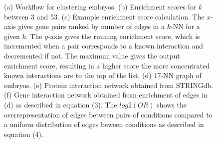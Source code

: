 \documentclass{article}
\begin{document}
\begin{figure}
\begin{subfigure}[b]{0.5\textwidth}
		\caption{}
		\label{}
	\end{subfigure}
	\caption{(a) Workflow for clustering embryos. 
	(b) Enrichment scores for $k$ between 3 and 53.
(c) Example enrichment score calculation. The $x$-axis gives gene pairs ranked by number of edges in a $k$-NN for a given $k$. The $y$-axis gives the running enrichment score, which is incremented when a pair corresponds to a known interaction and decremented if not. The maximum value gives the output enrichment score, resulting in a higher score the more concentrated known interactions are to the top of the list. 
(d) 17-NN graph of embryos.
(e) Protein interaction network obtained from STRINGdb.
(f) Gene interaction network obtained from enrichment of edges in (d) as described in equation (3). The $log2(OR)$ shows the overrepresentation of edges between pairs of conditions compared to a uniform distribution of edges beween conditions as described in equation (4).}
	\label{}

\end{figure}
\end{document}
